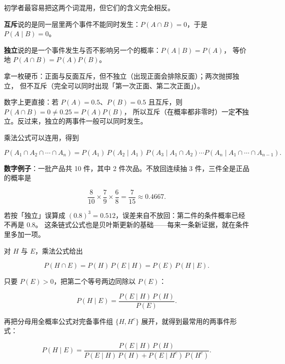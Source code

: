 \documentclass[11pt]{ctexart}
\begin{document}

初学者最容易把这两个词混用，但它们的含义完全相反。

\textbf{互斥}说的是同一层里两个事件不能同时发生：$P(A\cap B)=0$，于是 $P(A\mid B)=0$。

\textbf{独立}说的是一个事件发生与否不影响另一个的概率：$P(A\mid B)=P(A)$，
等价地 $P(A\cap B)=P(A)P(B)$。

拿一枚硬币：正面与反面互斥，但不独立（出现正面会排除反面）；两次抛掷独立，
但不互斥（完全可以同时出现「第一次正面、第二次正面」）。

数字上更直接：若 $P(A)=0.5$、$P(B)=0.5$ 且互斥，则 $P(A\cap B)=0\ne 0.25=P(A)P(B)$，
所以互斥（在概率都非零时）一定\textbf{不}独立。反过来，独立的两事件一般可以同时发生。



乘法公式可以连用，得到

\[
P(A_{1}\cap A_{2}\cap\cdots\cap A_{n})
=P(A_{1})\,P(A_{2}\mid A_{1})\,P(A_{3}\mid A_{1}\cap A_{2})\cdots P(A_{n}\mid A_{1}\cap\cdots\cap A_{n-1}) .
\]

\textbf{数字例子}：一批产品共 10 件，其中 2 件次品。不放回连续抽 3 件，三件全是正品的概率是

\[
\frac{8}{10}\times\frac{7}{9}\times\frac{6}{8}=\frac{7}{15}\approx 0.4667 .
\]

若按「独立」误算成 $(0.8)^{3}=0.512$，误差来自不放回：第二件的条件概率已经不再是 $0.8$。
这条链式公式也是贝叶斯更新的基础——每来一条新证据，就在条件里多加一项。



对 $H$ 与 $E$，乘法公式给出

\[
P(H\cap E)=P(H)\,P(E\mid H)=P(E)\,P(H\mid E).
\]

只要 $P(E)>0$，把第二个等号两边同除以 $P(E)$：

\[
P(H\mid E)=\frac{P(E\mid H)\,P(H)}{P(E)} .
\]

再把分母用全概率公式对完备事件组 $\{H,H^{c}\}$ 展开，就得到最常用的两事件形式：

\[
P(H\mid E)=\frac{P(E\mid H)\,P(H)}{P(E\mid H)\,P(H)+P(E\mid H^{c})\,P(H^{c})} .
\]
\end{document}
